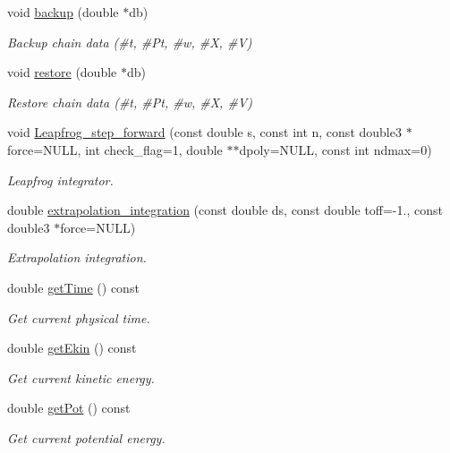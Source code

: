 \begin{DoxyCompactItemize}
void \hyperlink{classARC_1_1chain_a587009b6c6db0490c0f335aba732d77a}{backup} (double $\ast$db)
\begin{DoxyCompactList}\small\item\em Backup chain data (\#t, \#\+Pt, \#w, \#X, \#V) \end{DoxyCompactList}\item 
void \hyperlink{classARC_1_1chain_a2e7873b3a50ba9276d9a7595cb1d768d}{restore} (double $\ast$db)
\begin{DoxyCompactList}\small\item\em Restore chain data (\#t, \#\+Pt, \#w, \#X, \#V) \end{DoxyCompactList}\item 
void \hyperlink{classARC_1_1chain_a82b26731761231d86fd2e0b4529df6fa}{Leapfrog\+\_\+step\+\_\+forward} (const double s, const int n, const double3 $\ast$force=N\+U\+LL, int check\+\_\+flag=1, double $\ast$$\ast$dpoly=N\+U\+LL, const int ndmax=0)
\begin{DoxyCompactList}\small\item\em Leapfrog integrator. \end{DoxyCompactList}\item 
double \hyperlink{classARC_1_1chain_ab831215debbd09466cadb1b961dd0a18}{extrapolation\+\_\+integration} (const double ds, const double toff=-\/1., const double3 $\ast$force=N\+U\+LL)
\begin{DoxyCompactList}\small\item\em Extrapolation integration. \end{DoxyCompactList}\item 
double \hyperlink{classARC_1_1chain_a48bde99d89b99df54844e1331d4814bb}{get\+Time} () const
\begin{DoxyCompactList}\small\item\em Get current physical time. \end{DoxyCompactList}\item 
double \hyperlink{classARC_1_1chain_ad7e8b3a20521f095a6935845f8a2ee53}{get\+Ekin} () const
\begin{DoxyCompactList}\small\item\em Get current kinetic energy. \end{DoxyCompactList}\item 
double \hyperlink{classARC_1_1chain_ae59c00c676af34f22c650076eb0aa83a}{get\+Pot} () const
\begin{DoxyCompactList}\small\item\em Get current potential energy. \end{DoxyCompactList}\item 
$$
\end{DoxyCompactItemize}
